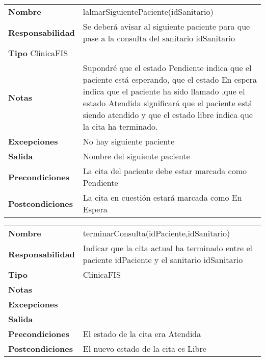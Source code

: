 
\begin{table}[htbp]
	  \begin{tabularx}{\textwidth}{l|l}
    \textbf{Nombre}        & lalmarSiguientePaciente(idSanitario) \\ 
    \textbf{Responsabilidad}  &  Se deberá avisar al siguiente paciente para que pase a la consulta del sanitario idSanitario \\ 
    \textbf{Tipo}  ClinicaFIS      &  \\ 
    \textbf{Notas}        & Supondré que el estado Pendiente indica que el paciente está esperando, que el estado En espera indica que el paciente ha sido llamado ,que el estado Atendida significará que el paciente está siendo atendido y que el estado libre indica que la cita ha terminado.  \\ 
    \textbf{Excepciones}    & No hay siguiente paciente \\ 
    \textbf{Salida}        & Nombre del siguiente paciente\\ 
    \textbf{Precondiciones}    & La cita del paciente debe estar marcada como Pendiente \\ 
    \textbf{Postcondiciones}  & La cita en cuestión estará marcada como En Espera \\ 
  \end{tabularx}

\end{table}


\begin{table}[htbp]
	  \begin{tabularx}{\textwidth}{l|l}
    \textbf{Nombre}        & terminarConsulta(idPaciente,idSanitario) \\ 
    \textbf{Responsabilidad}  & Indicar que la cita actual ha terminado entre el paciente idPaciente y el sanitario idSanitario \\ 
    \textbf{Tipo}        &  ClinicaFIS\\ 
    \textbf{Notas}        &  \\ 
    \textbf{Excepciones}    &  \\ 
    \textbf{Salida}        &  \\ 
    \textbf{Precondiciones}    & El estado de la cita era Atendida  \\ 
    \textbf{Postcondiciones}  & El nuevo estado de la cita es Libre\\ 
  \end{tabularx}

\end{table}

